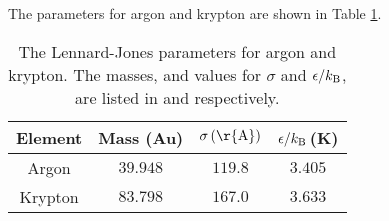 \documentclass{article}
\begin{document}
The parameters for argon and krypton are shown in Table \ref{table:LJParams}.

\begin{table}[h!t]
\centering
\caption{The Lennard-Jones parameters for argon and krypton. The masses, and values for $\sigma$ and $\epsilon/k_{\rm{B}}$, are listed in \cite{ReviewOfParticlePhysics} and \cite{StructureAndDiffusion} respectively. \label{table:LJParams} }
\begin{tabular}{|c|c|c|c| } 
\hline
Element & Mass (Au)& $\sigma\,(\rm{\r{A}})$ & $\epsilon/k_{\rm{B}}\,$(K)\\\hline
Argon	& $39.948$ & $119.8$ & $3.405$ \\
Krypton	& $83.798$ & $167.0$ & $3.633$ \\
\hline
\end{tabular}
\end{table}
 
\end{document}
